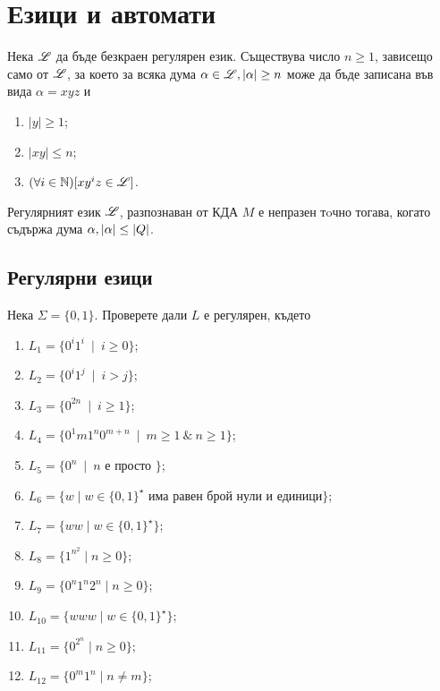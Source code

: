 \chapter{Езици и автомати}

\begin{lemma}
  Нека $\mathscr{L}$ да бъде безкраен регулярен език.
  Съществува число $n\geq 1$, зависещо само от $\mathscr{L}$, 
  за което за всяка дума $\alpha\in \mathscr{L}, \vert{\alpha}\vert\geq n$ може да 
  бъде записана във вида $\alpha = xyz$ и 
  \begin{enumerate}
  \item
    $|y|\geq 1$;
  \item
    $|xy|\leq n$;
  \item
    $(\forall i\in\mathbb{N})[xy^iz \in \mathscr{L}]$.
  \end{enumerate}
\end{lemma}

\begin{crl}
  Регулярният език $\mathscr{L}$, 
  разпознаван от КДА $M$ е непразен тoчно тогава, когато съдържа дума $\alpha, \vert{\alpha}\vert \leq \vert{Q}\vert$.
\end{crl}

\section{Регулярни езици}
\begin{problem}
  Нека $\Sigma = \{0,1\}$.  Проверете дали $L$ е регулярен, където
  \begin{enumerate}[1)]
  \item
    $L_1 = \{0^i1^i\ \mid\ i\geq 0\}$;
  \item
    $L_2 = \{0^i1^j\ \mid\ i > j\}$;
  \item
    $L_3 = \{0^{2n}\ \mid\ i\geq 1\}$;
  \item
    $L_4 = \{0^1m1^n0^{m+n}\ \mid\ m\geq 1\ \&\ n\geq 1\}$;
  \item
    $L_5 = \{0^n\ \mid\ n\mbox{ е просто }\}$;
  \item
    $L_6 = \{w\mid w\in\{0,1\}^\star\mbox{ има равен брой нули и единици}\}$;
  \item
    $L_7 = \{ww\mid w\in\{0,1\}^\star\}$;
  \item
    $L_8 = \{1^{n^2}\mid n\geq 0\}$;
  \item
    $L_{9} = \{0^n1^n2^n\mid n\geq 0\}$;
  \item
    $L_{10} = \{www\mid w\in \{0,1\}^\star\}$;
  \item
    $L_{11} = \{0^{2^n}\mid n\geq 0\}$;
  \item
    $L_{12} = \{0^m1^n\mid n\neq m\}$;
  \end{enumerate}
\end{problem}

